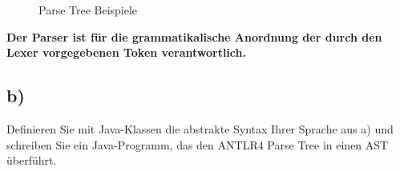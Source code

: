 \begin{figure}[h]
    \centering
    \qquad
    \caption{Parse Tree Beispiele}
    \label{fig:Aufgabe2a_parseTree}
\end{figure}
\newline

\textbf{Der Parser ist für die grammatikalische Anordnung der durch den Lexer vorgegebenen Token verantwortlich.}
\newpage

\subsection*{b)}
Definieren Sie mit Java-Klassen die abstrakte Syntax Ihrer Sprache aus a) und
schreiben Sie ein Java-Programm, das den ANTLR4 Parse Tree in einen AST überführt.

